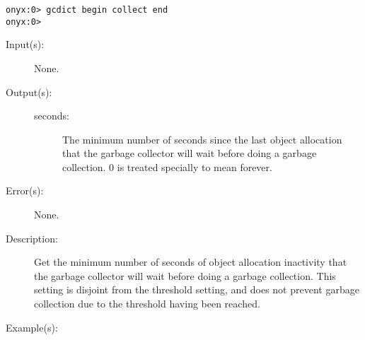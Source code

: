 \begin{description}
\begin{description}
\begin{verbatim}
onyx:0> gcdict begin collect end
onyx:0>
		\end{verbatim}
	\end{description}
\label{gcdict:period}
\item[{\onyxop{--}{period}{seconds}}: ]
	\begin{description}\item[]
	\item[Input(s): ] None.
	\item[Output(s): ]
		\begin{description}\item[]
		\item[seconds: ]
			The minimum number of seconds since the last object
			allocation that the garbage collector will wait before
			doing a garbage collection.  0 is treated specially to
			mean forever.
		\end{description}
	\item[Error(s): ] None.
	\item[Description: ]
		Get the minimum number of seconds of object allocation
		inactivity that the garbage collector will wait before doing a
		garbage collection.  This setting is disjoint from the threshold
		setting, and does not prevent garbage collection due to the
		threshold having been reached.
	\item[Example(s): ]\begin{verbatim}


\end{verbatim}
\end{description}
\end{description}
